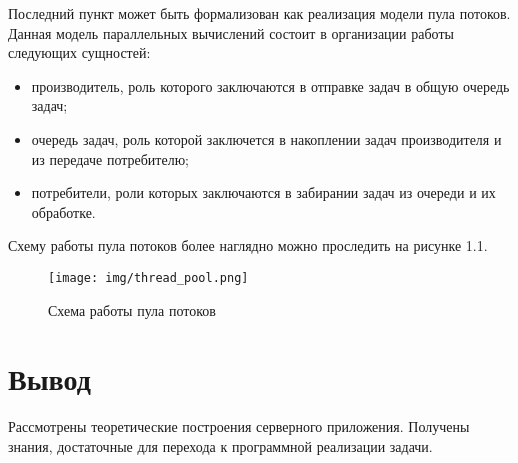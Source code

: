 Последний пункт может быть формализован как реализация модели пула потоков. Данная модель параллельных вычислений состоит в организации работы следующих сущностей:
\begin{itemize}
	\item производитель, роль которого заключаются в отправке задач в общую очередь задач;
	\item очередь задач, роль которой заключется в накоплении задач производителя и из передаче потребителю;
	\item потребители, роли которых заключаются в забирании задач из очереди и их обработке.
\end{itemize}

Схему работы пула потоков более наглядно можно проследить на рисунке 1.1.


\begin{figure}[ht!]
	\centering
	\texttt{[image: img/thread\_pool.png]}
	\caption{Схема работы пула потоков}
	\label{fig:tp}
\end{figure}


\section*{Вывод}

Рассмотрены теоретические построения серверного приложения. Получены знания, достаточные для перехода к программной реализации задачи.

\clearpage